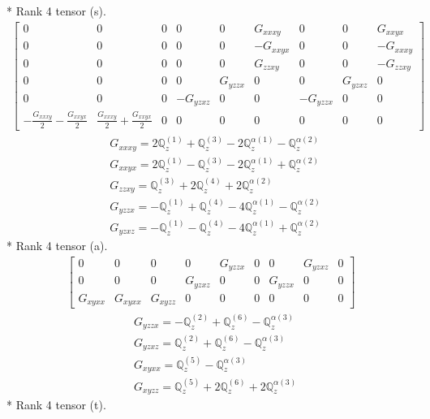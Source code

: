 \documentclass[fleqn,8pt,landscape]{jsarticle}
\begin{document}
* Rank 4 tensor (s).
\begin{align*}
\begin{bmatrix} 0 & 0 & 0 & 0 & 0 & G_{xxxy} & 0 & 0 & G_{xxyx} \\ 0 & 0 & 0 & 0 & 0 & - G_{xxyx} & 0 & 0 & - G_{xxxy} \\ 0 & 0 & 0 & 0 & 0 & G_{zzxy} & 0 & 0 & - G_{zzxy} \\ 0 & 0 & 0 & 0 & G_{yzzx} & 0 & 0 & G_{yzxz} & 0 \\ 0 & 0 & 0 & - G_{yzxz} & 0 & 0 & - G_{yzzx} & 0 & 0 \\ - \frac{G_{xxxy}}{2} - \frac{G_{xxyx}}{2} & \frac{G_{xxxy}}{2} + \frac{G_{xxyx}}{2} & 0 & 0 & 0 & 0 & 0 & 0 & 0 \end{bmatrix}
\end{align*}
\begin{align*}
& G_{xxxy} = 2 \mathbb{Q}_{z}^{(1)} + \mathbb{Q}_{z}^{(3)} - 2 \mathbb{Q}_{z}^{\alpha(1)} - \mathbb{Q}_{z}^{\alpha(2)} \\
& G_{xxyx} = 2 \mathbb{Q}_{z}^{(1)} - \mathbb{Q}_{z}^{(3)} - 2 \mathbb{Q}_{z}^{\alpha(1)} + \mathbb{Q}_{z}^{\alpha(2)} \\
& G_{zzxy} = \mathbb{Q}_{z}^{(3)} + 2 \mathbb{Q}_{z}^{(4)} + 2 \mathbb{Q}_{z}^{\alpha(2)} \\
& G_{yzzx} = - \mathbb{Q}_{z}^{(1)} + \mathbb{Q}_{z}^{(4)} - 4 \mathbb{Q}_{z}^{\alpha(1)} - \mathbb{Q}_{z}^{\alpha(2)} \\
& G_{yzxz} = - \mathbb{Q}_{z}^{(1)} - \mathbb{Q}_{z}^{(4)} - 4 \mathbb{Q}_{z}^{\alpha(1)} + \mathbb{Q}_{z}^{\alpha(2)}
\end{align*}
* Rank 4 tensor (a).
\begin{align*}
\begin{bmatrix} 0 & 0 & 0 & 0 & G_{yzzx} & 0 & 0 & G_{yzxz} & 0 \\ 0 & 0 & 0 & G_{yzxz} & 0 & 0 & G_{yzzx} & 0 & 0 \\ G_{xyxx} & G_{xyxx} & G_{xyzz} & 0 & 0 & 0 & 0 & 0 & 0 \end{bmatrix}
\end{align*}
\begin{align*}
& G_{yzzx} = - \mathbb{Q}_{z}^{(2)} + \mathbb{Q}_{z}^{(6)} - \mathbb{Q}_{z}^{\alpha(3)} \\
& G_{yzxz} = \mathbb{Q}_{z}^{(2)} + \mathbb{Q}_{z}^{(6)} - \mathbb{Q}_{z}^{\alpha(3)} \\
& G_{xyxx} = \mathbb{Q}_{z}^{(5)} - \mathbb{Q}_{z}^{\alpha(3)} \\
& G_{xyzz} = \mathbb{Q}_{z}^{(5)} + 2 \mathbb{Q}_{z}^{(6)} + 2 \mathbb{Q}_{z}^{\alpha(3)}
\end{align*}
* Rank 4 tensor (t).
\end{document}
